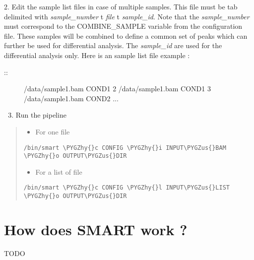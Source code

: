 \documentclass[letterpaper,10pt,english]{sphinxmanual}
\def\PYGZus{\char`\_}
\def\PYGZhy{\char`\-}
\begin{document}
2. Edit the sample list files in case of multiple samples. This file must be tab delimited with \emph{sample\_number} t \emph{file} t \emph{sample\_id}.
Note that the \emph{sample\_number} must correspond to the COMBINE\_SAMPLE variable from the configuration file. These samples will be combined to define a common set of peaks which can further be used for differential analysis.
The \emph{sample\_id} are used for the differential analysis only.
Here is an sample list file example :
\begin{description}
\item[{::}]      /data/sample1.bam       COND1
2     /data/sample1.bam       COND1
3     /data/sample1.bam       COND2
...

\end{description}
\begin{enumerate}
\setcounter{enumi}{2}
\item {} 
Run the pipeline

\end{enumerate}
\begin{quote}
\begin{itemize}
\item {} 
For one file

\end{itemize}

\begin{Verbatim}[commandchars=\\\{\}]
/bin/smart \PYGZhy{}c CONFIG \PYGZhy{}i INPUT\PYGZus{}BAM \PYGZhy{}o OUTPUT\PYGZus{}DIR
\end{Verbatim}
\begin{itemize}
\item {} 
For a list of file

\end{itemize}

\begin{Verbatim}[commandchars=\\\{\}]
/bin/smart \PYGZhy{}c CONFIG \PYGZhy{}l INPUT\PYGZus{}LIST \PYGZhy{}o OUTPUT\PYGZus{}DIR
\end{Verbatim}
\end{quote}


\section{How does SMART work ?}
\label{MANUAL:how-does-smart-work}
TODO



\renewcommand{\indexname}{Index}
\printindex
\end{document}
